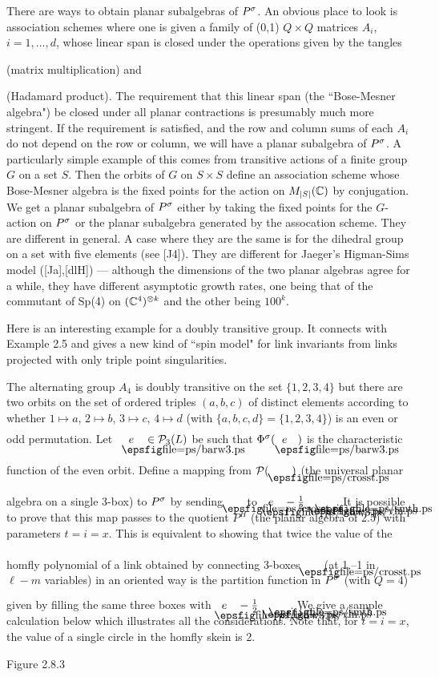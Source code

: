 \bs There are ways to obtain planar subalgebras of
$P^\sigma$. An obvious place to look is association schemes 
where one is given a family of (0,1) $Q\times Q$ matrices $A_i$,
$i=1,\dots ,d$, whose linear span is closed under the operations
given by the tangles
\medskip

(matrix multiplication) and

(Hadamard product).
\medskip\ni
The requirement that this linear span (the
``Bose-Mesner algebra") be closed under all planar contractions is
presumably much more stringent. If the requirement is satisfied, and the row and
column sums of each $A_i$ do not depend on the row or column, we
will have a planar subalgebra of
$P^\sigma$. A particularly simple example of this comes from transitive
actions of a finite group $G$ on a set $S$. Then the orbits of $G$
on $S\times S$ define an association scheme whose Bose-Mesner
algebra is the fixed points for the action on $M_{|S|}(\Bbb C)$ by
conjugation. We get a planar subalgebra of $P^\sigma$ either
by taking the fixed points for the $G$-action on $P^\sigma$ or the
planar subalgebra generated by the assocation scheme. They are
different in general. A case where they are the same is for the
dihedral group on a set with five elements (see [J4]). They
are different for Jaeger's Higman-Sims model ([Ja],[dlH])
 --- although the dimensions of the two planar algebras agree for
a while, they have different asymptotic growth rates, one being that
of the commutant of Sp(4) on $(\Bbb C^4)^{\otimes k}$ and the other
being $100^k$. 

Here is an interesting example for a doubly transitive group.
It connects with Example 2.5 and gives a new kind of ``spin model"
for link invariants from links projected with only triple point
singularities.

The alternating group $A_4$ is doubly transitive on the set
$\{1,2,3,4\}$ but there are two orbits on the set of ordered
triples $(a,b,c)$ of distinct elements according to whether
$1\mapsto a$, $2\mapsto b$, $3\mapsto c$, $4\mapsto d$
(with $\{a,b,c,d\}=\{1,2,3,4\}$) is an even or odd permutation.
Let \ $\boxe{e}\in{\cal P}_3(L)$ be such that
$\Phi^\s(\boxe{e})$ is the characteristic
function  of the even orbit. Define a mapping from
${\cal P}(\ \crsst\ )$ (the universal planar algebra on a single 3-box)
to $P^\sigma$ by sending $\crsst$ to
$\boxe{e}-\frac 12 \vln\ \  \smth$.
It is possible to prove that this map passes to the quotient
$P^H$ (the planar algebra of 2.5) with parameters  $t=i=x$.
This is equivalent to showing that twice the value of the {\sc
homfly} polynomial of a link obtained by connecting 3-boxes
$\crsst$ (at 1,--1 in $\ell-m$ variables) in an oriented way is
the partition function in $P^\sigma$ (with $Q=4$) given by filling the
same three boxes with $\boxe{e}-\frac 12 \vln\ \ \smth$. 
We give a sample calculation below
which illustrates all the considerations. Note that, for $t=i=x$,
the value of a single circle in the {\sc homfly} skein is 2.
\[
        
\]
\begin{center}
        Figure 2.8.3
\end{center}

